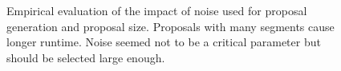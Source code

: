 \documentclass[10pt,twocolumn,letterpaper]{article}
\theoremstyle{definition}
\begin{document}
\begin{figure}[th]
\centering
{}
\caption{Empirical evaluation of the impact of noise used for proposal generation and proposal size.
  Proposals with many segments cause longer runtime. Noise seemed not to be a critical parameter but should be selected large enough.
}
\label{fig:parameterchoice}
\end{figure}
\end{document}

